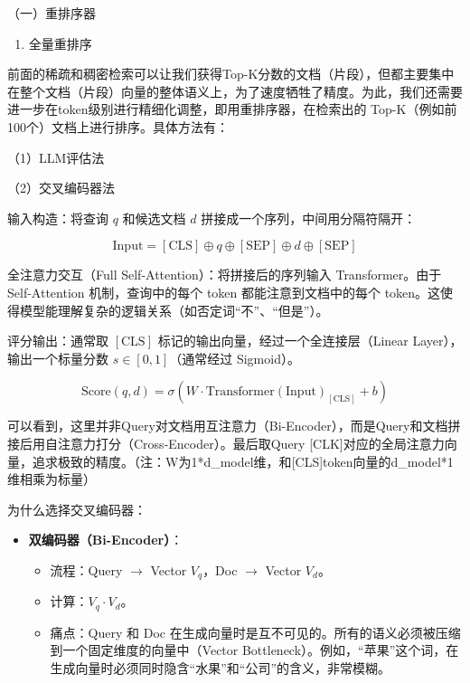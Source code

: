 （一）重排序器

\begin{enumerate}
\def\labelenumi{\arabic{enumi}.}
\tightlist
\item
  全量重排序
\end{enumerate}

前面的稀疏和稠密检索可以让我们获得Top-K分数的文档（片段），但都主要集中在整个文档（片段）向量的整体语义上，为了速度牺牲了精度。为此，我们还需要进一步在token级别进行精细化调整，即用重排序器，在检索出的 Top-K（例如前100个）文档上进行排序。具体方法有：

（1）LLM评估法

（2）交叉编码器法

输入构造：将查询 \(q\) 和候选文档 \(d\) 拼接成一个序列，中间用分隔符隔开：

\[
\mathrm{Input}=[\mathrm{CLS}]\oplus q\oplus[\mathrm{SEP}]\oplus d\oplus[\mathrm{SEP}]
\]

全注意力交互（Full Self-Attention）：将拼接后的序列输入 Transformer。由于 Self-Attention 机制，查询中的每个 token 都能注意到文档中的每个 token。这使得模型能理解复杂的逻辑关系（如否定词``不''、``但是''）。

评分输出：通常取 \([\mathrm{CLS}]\) 标记的输出向量，经过一个全连接层（Linear Layer），输出一个标量分数 \(s\in[0,1]\)（通常经过 Sigmoid）。

\[
\mathrm{Score}(q,d)=\sigma\left(W\cdot\mathrm{Transformer}(\mathrm{Input})_{[\mathrm{CLS}]}+b\right)
\]

可以看到，这里并非Query对文档用互注意力（Bi-Encoder），而是Query和文档拼接后用自注意力打分（Cross-Encoder）。最后取Query {[}CLK{]}对应的全局注意力向量，追求极致的精度。（注：W为1*d\_model维，和{[}CLS{]}token向量的d\_model*1维相乘为标量）

为什么选择交叉编码器：

\begin{itemize}
\tightlist
\item
{}
  \textbf{双编码器（Bi-Encoder）}：

  \begin{itemize}
  \tightlist
  \item
    流程：Query \(\to\) Vector \(V_q\)，Doc \(\to\) Vector \(V_d\)。
  \item
    计算：\(V_q\cdot V_d\)。
  \item
    痛点：Query 和 Doc 在生成向量时是互不可见的。所有的语义必须被压缩到一个固定维度的向量中（Vector Bottleneck）。例如，``苹果''这个词，在生成向量时必须同时隐含``水果''和``公司''的含义，非常模糊。
  \end{itemize}
\end{itemize}

